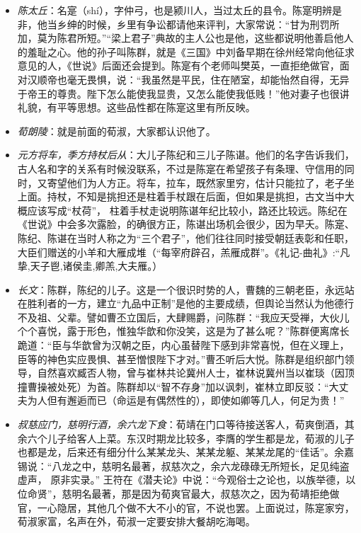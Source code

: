 \documentclass[]{book}
\providecommand{\tightlist}{%
  \setlength{\itemsep}{0pt}\setlength{\parskip}{0pt}}
\begin{document}
\begin{itemize}
\tightlist
\item
  \emph{陈太丘}：名寔（shí），字仲弓，也是颍川人，当过太丘的县令。陈寔明辨是非，他当乡绅的时候，乡里有争讼都请他来评判，大家常说：``甘为刑罚所加，莫为陈君所短。''``梁上君子''典故的主人公也是他，这些都说明他善启他人的羞耻之心。他的孙子叫陈群，就是《三国》中刘备早期在徐州经常向他征求意见的人，《世说》后面还会提到。陈寔有个老师叫樊英，一直拒绝做官，面对汉顺帝也毫无畏惧，说：``我虽然是平民，住在陋室，却能怡然自得，无异于帝王的尊贵。陛下怎么能使我显贵，又怎么能使我低贱！''他对妻子也很讲礼貌，有平等思想。这些品性都在陈寔这里有所反映。
\item
  \emph{荀朗陵}：就是前面的荀淑，大家都认识他了。
\item
  \emph{元方将车，季方持杖后从}：大儿子陈纪和三儿子陈谌。他们的名字告诉我们，古人名和字的关系有时候没联系，不过是陈寔在希望孩子有条理、守信用的同时，又寄望他们为人方正。将车，拉车，既然家里穷，估计只能拉了，老子坐上面。持杖，不知是挑担还是柱着手杖跟在后面，但如果是挑担，古文当中大概应该写成``杖荷''，
  柱着手杖走说明陈谌年纪比较小，路还比较远。陈纪在《世说》中会多次露脸，的确很方正，陈谌出场机会很少，因为早夭。陈寔、陈纪、陈谌在当时人称之为``三个君子''，他们往往同时接受朝廷表彰和任职，大臣们赠送的小羊和大雁成堆（``每宰府辟召，羔雁成群''。《礼记-曲礼》:``凡挚,天子鬯,诸侯圭,卿羔,大夫雁。）
\item
  \emph{长文}：陈群，陈纪的儿子。这是一个很识时势的人，曹魏的三朝老臣，永远站在胜利者的一方，建立``九品中正制''是他的主要成绩，但舆论当然认为他德行不及祖、父辈。譬如曹丕立国后，大肆赐爵，问陈群：``我应天受禅，大伙儿个个喜悦，露于形色，惟独华歆和你没笑，这是为了甚么呢？''陈群便离席长跪道：``臣与华歆曾为汉朝之臣，内心虽替陛下感到非常喜悦，但在义理上，臣等的神色实应畏惧、甚至憎恨陛下才对。''曹丕听后大悦。陈群是组织部门领导，自然喜欢臧否人物，曾与崔林共论冀州人士，崔林说冀州当以崔琰（因顶撞曹操被处死）为首。陈群却以``智不存身''加以讽刺，崔林立即反驳：``大丈夫为人但有邂逅而已（命运是有偶然性的），即使如卿等几人，何足为贵！''
\item
  \emph{叔慈应门，慈明行酒，余六龙下食}：荀靖在门口等待接送客人，荀爽倒酒，其余六个儿子给客人上菜。东汉时期龙比较多，李膺的学生都是龙，荀淑的儿子也都是龙，后来还有细分什么某某龙头、某某龙躯、某某龙尾的``佳话''。余嘉锡说：``八龙之中，慈明名最著，叔慈次之，余六龙碌碌无所短长，足见纯盗虚声，
  原非实录。''
  王符在《潜夫论》中说：``今观俗士之论也，以族举德，以位命贤''，慈明名最著，那是因为荀爽官最大，叔慈次之，因为荀靖拒绝做官，一心隐居，其他几个做不大不小的官，不说也罢。上面说过，陈寔家穷，荀淑家富，名声在外，荀淑一定要安排大餐胡吃海喝。

\end{itemize}
\end{document}
